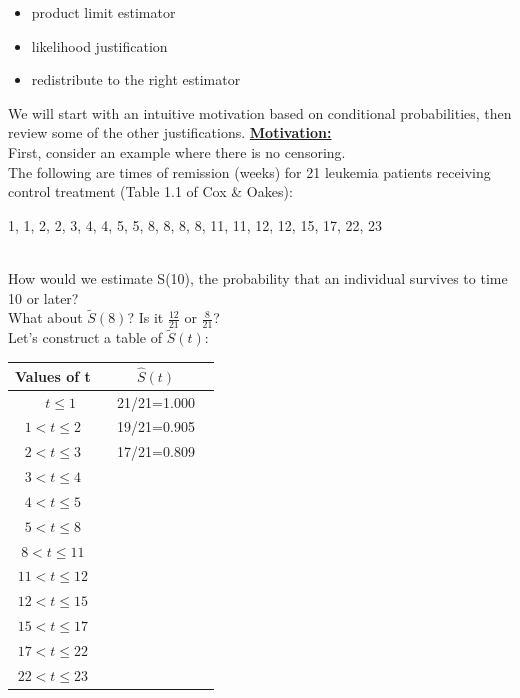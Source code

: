 \documentclass[11pt,slidesonly,semrot,portrait,palatino]{book}
\begin{document}
\begin{itemize}
\item product limit estimator
\item likelihood justification
\item redistribute to the right estimator
\end{itemize}
We will start with an intuitive motivation based on conditional
probabilities, then review some of the other justifications.
\newpage\noindent
\underline{\bf Motivation:}\\[1ex]
First, consider an example where there is no censoring. \\[1ex]
The following are times of remission (weeks) for 21 leukemia patients
receiving control treatment (Table 1.1 of Cox \& Oakes): \\[1.5ex]
\centerline{1, 1, 2, 2, 3, 4, 4, 5, 5, 8, 8, 8, 8, 11, 11, 12, 12, 15,
17, 22, 23}\\[2ex]
How would we estimate S(10), the probability that
an individual survives to time 10 or later?
\\[2ex]
What about $\tilde{S}(8)$?   Is it $\frac{12}{21}$ or $\frac{8}{21}$?\\[2ex]
Let's construct a table of $\tilde{S}(t)$:
\begin{center}
\begin{tabular}{cc}
Values of t   & ~~~~$\hat{S}(t)$~~~~ \\
\hline
$~~~~~ t \le 1 $  & 21/21=1.000 \\
$1 < t \le 2 $  & 19/21=0.905\\
$2 < t \le 3 $  & 17/21=0.809\\
$3 < t \le 4 $  & \\
$4 < t \le 5 $  & \\
$5 < t \le 8 $  & \\
$8 < t \le 11 $ &\\
$11 < t \le 12 $ &\\
$12 < t \le 15 $ &\\
$15 < t \le 17 $ &\\
$17 < t \le 22 $ &\\
$22 < t \le 23 $ &\\
\end{tabular}
\end{center}
\end{document}
